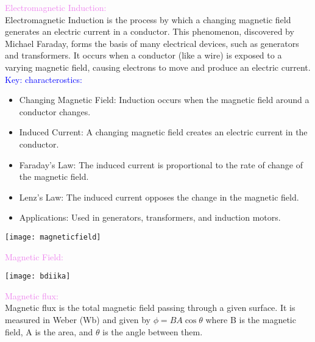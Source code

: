 \documentclass{beamer}
\begin{document}
\begin{frame}
\textcolor{violet}{Electromagnetic Induction:} \\

Electromagnetic Induction is the process by which a changing magnetic field generates an electric current in a conductor. This phenomenon, discovered by Michael Faraday, forms the basis of many electrical devices, such as generators and transformers. It occurs when a conductor (like a wire) is exposed to a varying magnetic field, causing electrons to move and produce an electric current.\\

\textcolor{blue}{Key: characterostics:}\\

    \begin{itemize}
    \item  Changing Magnetic Field: Induction occurs when the magnetic field around a conductor changes.

\item Induced Current: A changing magnetic field creates an electric current in the conductor.

\item Faraday’s Law: The induced current is proportional to the rate of change of the magnetic field.

\item Lenz’s Law: The induced current opposes the change in the magnetic field.

\item Applications: Used in generators, transformers, and induction motors.
    \end{itemize}
\end{frame}

\begin{frame}
\begin{center}
\texttt{[image: magneticfield]}
\end{center}
\end{frame}

\begin{frame}
\textcolor{violet}{Magnetic Field:} \\
\begin{center}
\texttt{[image: bdiika]}

\end{center}
\textcolor{violet}{Magnetic flux:}\\
Magnetic flux is the total magnetic field passing through a given surface. It is measured in Weber (Wb) and given by $\phi = BA\cos\theta$ where B is the magnetic field, A is the area, and $\theta$ is the angle between them.

\end{frame}
\end{document}
